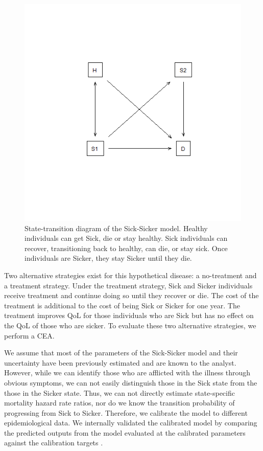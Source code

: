 \documentclass[]{book}
\begin{document}
\begin{figure}

{\centering \includegraphics[width=6.67in]{../figs/02_model_diagram} 

}

\caption{State-transition diagram of the Sick-Sicker model. Healthy individuals can get Sick, die or stay healthy. Sick individuals can recover, transitioning back to healthy, can die, or stay sick. Once individuals are Sicker, they stay Sicker until they die.}\label{fig:STM-Sick-Sicker}
\end{figure}

Two alternative strategies exist for this hypothetical disease: a
no-treatment and a treatment strategy. Under the treatment strategy,
Sick and Sicker individuals receive treatment and continue doing so
until they recover or die. The cost of the treatment is additional to
the cost of being Sick or Sicker for one year. The treatment improves
QoL for those individuals who are Sick but has no effect on the QoL of
those who are sicker. To evaluate these two alternative strategies, we
perform a CEA.

We assume that most of the parameters of the Sick-Sicker model and their
uncertainty have been previously estimated and are known to the analyst.
However, while we can identify those who are afflicted with the illness
through obvious symptoms, we can not easily distinguish those in the
Sick state from the those in the Sicker state. Thus, we can not directly
estimate state-specific mortality hazard rate ratios, nor do we know the
transition probability of progressing from Sick to Sicker. Therefore, we
calibrate the model to different epidemiological data. We internally
validated the calibrated model by comparing the predicted outputs from
the model evaluated at the calibrated parameters against the calibration
targets \citep[\citet{Goldhaber_Fiebert2010}]{Eddy2012}.
\end{document}
